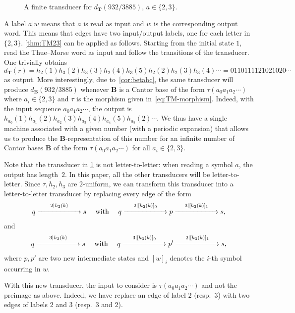 \documentclass[12pt,reqno]{amsart}
\newcommand{\B}{{\mathbf{B}}}
\begin{document}
\begin{example}
\begin{figure}[ht]
\begin{center}
\end{center}
 \caption{A finite transducer for $d_{\mathbf{T}}(932/3885)$, $a\in\{2,3\}$.}
    \label{fig:transducer-fig}
\end{figure}
A label $a|w$ means that $a$ is read as input and $w$ is the corresponding output word. This means that edges have two input/output labels, one for each letter in $\{2,3\}$. \cref{thm:TM23} can be applied as follows. Starting from the initial state $1$, read the Thue--Morse word as input and follow the transitions of the transducer. One trivially obtains 
\[
    d_{\mathbf{T}}(r)
    =h_2(1)h_3(2)h_3(3)h_2(4)h_3(5)h_2(2)h_2(3)h_3(4)\cdots=0110111121021020\cdots
\] 
as output. More interestingly, due to~\cref{cor:betahc}, the same transducer will produce $d_\B(932/3885)$ whenever $\B$ is a Cantor base of the form $\tau(a_0a_1a_2\cdots)$ where $a_i\in\{2,3\}$ and $\tau$ is the morphism given in~\eqref{eq:TM-morphism}. Indeed, with the input sequence $a_0a_1a_2\cdots$, the output is $h_{a_0}(1)h_{a_1}(2)h_{a_2}(3)h_{a_3}(4)h_{a_4}(5)h_{a_5}(2)\cdots$. We thus have a single machine associated with a given number (with a periodic expansion) that allows us to produce the $\B$-representation of this number for an infinite number of Cantor bases $\B$ of the form $\tau(a_0a_1a_2\cdots)$ for all $a_i\in\{2,3\}$. 

Note that the transducer in \cref{fig:transducer-fig} is not letter-to-letter: when reading a symbol $a$, the output has length~$2$. In this paper, all the other transducers will be letter-to-letter. Since $\tau,h_2,h_3$ are $2$-uniform, we can transform this transducer into a letter-to-letter transducer by replacing every edge of the form
\[
    q \stackrel{2|h_2(k)}{\xrightarrow{\hspace{2 cm}}} s 
    \quad\text{ with }\quad 
    q \stackrel{2|[h_2(k)]_0}{\xrightarrow{\hspace{2 cm}}} p \stackrel{3|[h_2(k)]_1} {\xrightarrow{\hspace{2 cm}}} s,
\]
and 
\[
    q \stackrel{3|h_3(k)}{\xrightarrow{\hspace{2 cm}}} s 
    \quad\text{ with }\quad 
    q \stackrel{3|[h_3(k)]_0}{\xrightarrow{\hspace{2 cm}}} p' \stackrel{2|[h_3(k)]_1} {\xrightarrow{\hspace{2 cm}}} s,
\]
where $p,p'$ are two new intermediate states and $[w]_i$ denotes the $i$-th symbol occurring in $w$.

With this new transducer, the input to consider is $\tau(a_0a_1a_2\cdots)$ and not the preimage as above. Indeed, we have replace an edge of label $2$ (resp.\ $3$) with two edges of labels $2$ and $3$ (resp.\ $3$ and $2$).
\end{example}
\end{document}
